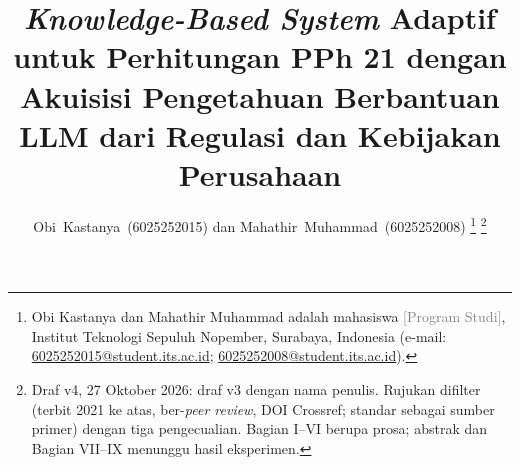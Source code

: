 \documentclass[journal,a4paper]{IEEEtran}
\newcommand{\en}[1]{\textit{#1}}
\newif\ifrancangan \rancangantrue
\newcommand{\isian}[1]{\ifrancangan\textcolor{gray}{[#1]}\else[#1]\fi}
\begin{document}
\title{\en{Knowledge-Based System} Adaptif untuk Perhitungan PPh 21 dengan Akuisisi Pengetahuan Berbantuan LLM dari Regulasi dan Kebijakan Perusahaan}
\author{Obi~Kastanya~(6025252015) dan Mahathir~Muhammad~(6025252008)%
\thanks{Obi Kastanya dan Mahathir Muhammad adalah mahasiswa \isian{Program Studi}, Institut Teknologi Sepuluh Nopember, Surabaya, Indonesia (e-mail: \url{6025252015@student.its.ac.id}; \url{6025252008@student.its.ac.id}).}%
\thanks{Draf v4, 27 Oktober 2026: draf v3 dengan nama penulis. Rujukan difilter (terbit 2021 ke atas, ber-\en{peer review}, DOI Crossref; standar sebagai sumber primer) dengan tiga pengecualian. Bagian I--VI berupa prosa; abstrak dan Bagian VII--IX menunggu hasil eksperimen.}}
\maketitle














\end{document}

